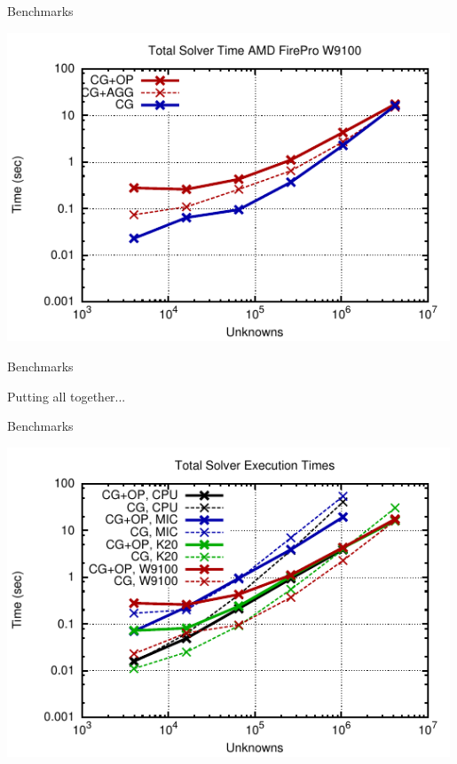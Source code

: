 \begin{frame}{Benchmarks}
  \begin{center}
   \includegraphics[width=0.99\textwidth]{figures/w9100-full.pdf}
  \end{center}
\end{frame}




\begin{frame}{Benchmarks}
  \begin{center}
   Putting all together...
  \end{center}
\end{frame}

\begin{frame}{Benchmarks}
  \begin{center}
   \includegraphics[width=0.99\textwidth]{figures/amg-vs-pure-full-4.pdf}
  \end{center}
\end{frame}




